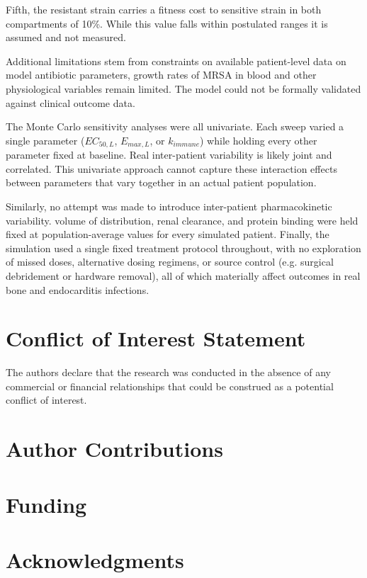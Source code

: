 \documentclass[utf8]{FrontiersinHarvard} %
\begin{document}
Fifth, the resistant strain carries a fitness cost to sensitive strain in both compartments of
10\%. While this value falls within postulated ranges it is assumed and not measured.

Additional limitations stem from constraints on available patient-level
data on model antibiotic parameters, growth rates of
MRSA in blood and other physiological variables remain limited.  The
model could not be formally validated against clinical outcome data.

The Monte Carlo sensitivity analyses were all univariate. Each sweep varied
a single parameter ($EC_{50,L}$, $E_{max,L}$, or $k_{immune}$) while
holding every other parameter fixed at baseline. Real
inter-patient variability is likely joint and correlated.  This univariate approach cannot capture
these interaction effects between parameters that vary together in an actual
patient population.

Similarly, no attempt was made to introduce
inter-patient pharmacokinetic variability.  volume of distribution,
renal clearance, and protein binding were held fixed at population-average
values for every simulated patient. Finally, the simulation
used a single fixed treatment protocol throughout, with no exploration
of missed doses, alternative dosing regimens, or source control (e.g.
surgical debridement or hardware removal), all of which materially
affect outcomes in real bone and endocarditis infections.

\section*{Conflict of Interest Statement}
The authors declare that the research was conducted in the absence of any commercial or financial relationships that could be construed as a potential conflict of interest.

\section*{Author Contributions}

\section*{Funding}

\section*{Acknowledgments}
\end{document}
